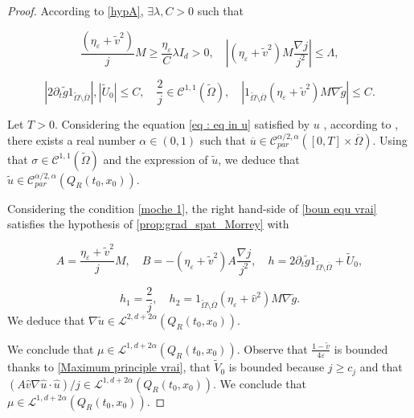 \documentclass[reqno,12pt,twoside]{amsart}
\numberwithin{equation}{section} \numberwithin{theorem}{section}
\numberwithin{proposition}{section} \numberwithin{lemma}{section}
\numberwithin{corollary}{section}
\numberwithin{definition}{section} \numberwithin{remark}{section}
\begin{document}
\begin{proof}
According to \eqref{hypA}, $\exists \lambda, C >0$ such that

\[\frac{(\eta_\varepsilon + \widetilde{v}^2)}{j}M \geqslant \frac{\eta_\varepsilon}{C}\lambda I_d > 0, \quad \left|(\eta_\varepsilon + \widetilde{v}^2) M \frac{\nabla j}{j^2}\right| \leqslant \Lambda,\]

\begin{equation}\label{moche 1}
\left|2 \partial_t \widetilde{g}1_{\widetilde{\Omega}\setminus \overline{\Omega}}\right|, |\widetilde{U}_0| \leqslant C,\quad  \frac{2}{j} \in \mathcal{C}^{1,1}(\widetilde{\Omega}), \quad \left|1_{\widetilde{\Omega}\setminus \overline{\Omega}} (\eta_\varepsilon + \widetilde{v}^2) M \nabla \widetilde{g}\right| \leqslant C.
\end{equation}

Let $T >0$.  
Considering the equation \eqref{eq : eq in u} satisfied by $u$ , according to \cite[Theorem IV.1.2]{DB93}, there exists a real number $\alpha \in (0,1)$ such that $\overline{u} \in \mathcal{C}_{par}^{\alpha/2,\alpha}([0,T]\times \overline{\Omega})$. Using that $\sigma \in \mathcal{C}^{1,1}(\widetilde{\Omega})$ and the expression of $\widetilde{u}$, we deduce that $\widetilde{u}\in \mathcal{C}_{par}^{\alpha/2,\alpha}(Q_{R}(t_0,x_0))$. 
 
Considering the condition \eqref{moche 1}, the right hand-side of \eqref{boun equ vrai} 
satisfies the hypothesis of \autoref{prop:grad_spat_Morrey} with 

\[A= \dfrac{\eta_\varepsilon + \widetilde{v}^2}{j}M, \quad B=- (\eta_\varepsilon + \widetilde{v}^2)A \dfrac{\nabla j}{j^2}, \quad h= 2 \partial_t \widetilde{g} 1_{\widetilde{\Omega}\setminus \overline{\Omega}} + \widetilde{U}_0,\]

\[h_1 = \frac{2}{j}, \quad h_2 = 1_{\widetilde{\Omega} \setminus \overline{\Omega}} (\eta_\varepsilon + \hat{v}^2)M\nabla \widetilde{g}.\]
We deduce that $\nabla \widetilde{u} \in \mathcal{L}^{2,d+2\alpha}(Q_R(t_0,x_0))$. 

\smallskip

We conclude that $\mu \in \mathcal{L}^{1,d+2\alpha}(Q_R(t_0,x_0))$. Observe that $\frac{1-\widetilde{v}}{4\varepsilon}$ is bounded thanks to \autoref{Maximum principle vrai}, that $\widetilde{V}_0$ is bounded because $j\geqslant c_j$ and that  $(A\hat{v}\nabla \hat{u} \cdot \hat{u})/j \in \mathcal{L}^{1,d+2\alpha}(Q_{R}(t_0,x_0))$. We conclude that $\mu \in \mathcal{L}^{1,d+2\alpha}(Q_{R}(t_0,x_0))$.
\end{proof}
\end{document}
